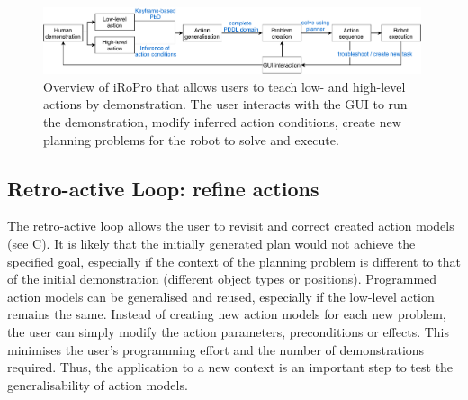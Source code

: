 \begin{figure}
	\centering
	\includegraphics[width=0.99\textwidth]{Fig6.pdf}
	\caption{Overview of iRoPro that allows users to teach low- and high-level actions by demonstration. The user interacts with the GUI to run the demonstration, modify inferred action conditions, create new planning problems for the robot to solve and execute.}
	\label{fig:overview}
\end{figure}
\subsection{Retro-active Loop: refine actions}
The retro-active loop allows the user to revisit and correct created action models (see C).
It is likely that the initially generated plan would not achieve the specified goal, especially if the context of the planning problem is different to that of the initial demonstration (\eg different object types or positions).
Programmed action models can be generalised and reused, especially if the low-level action remains the same.
Instead of creating new action models for each new problem, the user can simply modify the action parameters, preconditions or effects.
This minimises the user's programming effort and the number of demonstrations required.
Thus, the application to a new context is an important step to test the generalisability of action models.

